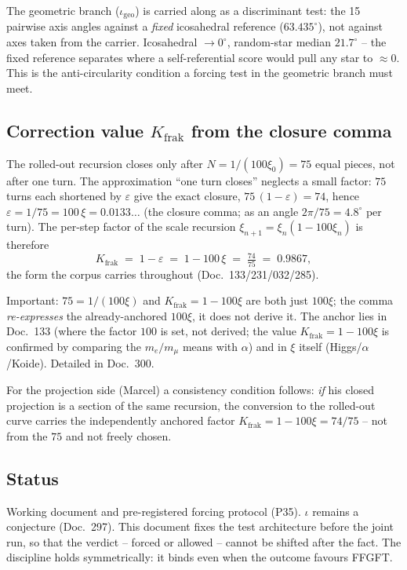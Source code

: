 The geometric branch ($\iota_{\text{geo}}$) is carried along as a discriminant
test: the 15 pairwise axis angles against a \emph{fixed} icosahedral reference
($63{.}435^\circ$), not against axes taken from the carrier. Icosahedral
$\to 0^\circ$, random-star median $21{.}7^\circ$ -- the fixed reference
separates where a self-referential score would pull any star to $\approx 0$.
This is the anti-circularity condition a forcing test in the geometric branch
must meet.

\subsection*{Correction value $K_{\text{frak}}$ from the closure comma}

The rolled-out recursion closes only after $N=1/(100\xi_0)=75$ equal pieces, not
after one turn. The approximation ``one turn closes'' neglects a small factor:
$75$ turns each shortened by $\varepsilon$ give the exact closure,
$75\,(1-\varepsilon)=74$, hence $\varepsilon = 1/75 = 100\,\xi = 0{.}0133\ldots$
(the closure comma; as an angle $2\pi/75 = 4{.}8^\circ$ per turn). The per-step
factor of the scale recursion $\xi_{n+1}=\xi_n(1-100\xi_n)$ is therefore
\[
  K_{\text{frak}} \;=\; 1 - \varepsilon \;=\; 1 - 100\,\xi \;=\; \tfrac{74}{75}
  \;=\; 0{.}9867,
\]
the form the corpus carries throughout (Doc.~133/231/032/285).

Important: $75=1/(100\xi)$ and $K_{\text{frak}}=1-100\xi$ are both just $100\xi$;
the comma \emph{re-expresses} the already-anchored $100\xi$, it does not derive
it. The anchor lies in Doc.~133 (where the factor $100$ is set, not derived;
the value $K_{\text{frak}}=1-100\xi$ is confirmed by comparing the $m_e/m_\mu$
means with $\alpha$) and in $\xi$ itself
(Higgs/$\alpha$/Koide). Detailed in Doc.~300.

For the projection side (Marcel) a consistency condition follows: \emph{if} his
closed projection is a section of the same recursion, the conversion to the
rolled-out curve carries the independently anchored factor
$K_{\text{frak}}=1-100\xi=74/75$ -- not from the $75$ and not freely chosen.

\subsection*{Status}

Working document and pre-registered forcing protocol (P35). $\iota$ remains a
conjecture (Doc.~297). This document fixes the test architecture before the
joint run, so that the verdict -- forced or allowed -- cannot be shifted after
the fact. The discipline holds symmetrically: it binds even when the outcome
favours FFGFT.
